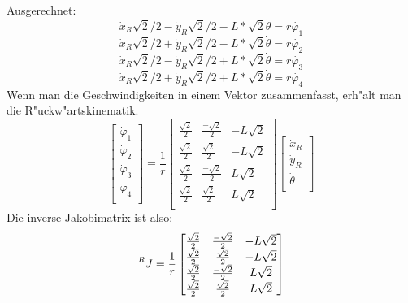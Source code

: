 \documentclass[11pt]{article}
\begin{document}
    Ausgerechnet:
    \begin{equation}
        \dot{x}_{R}\sqrt{2}/2 - \dot{y}_{R}\sqrt{2}/2 - L*\sqrt{2}\dot{\theta} = r\dot{\varphi_{1}}\label{eq:calc1}
    \end{equation}
    \begin{equation}
        \dot{x}_{R}\sqrt{2}/2 + \dot{y}_{R}\sqrt{2}/2 - L*\sqrt{2}\dot{\theta} = r\dot{\varphi_{2}}\label{eq:calc2}
    \end{equation}
    \begin{equation}
        \dot{x}_{R}\sqrt{2}/2 - \dot{y}_{R}\sqrt{2}/2 + L*\sqrt{2}\dot{\theta} = r\dot{\varphi_{3}}\label{eq:calc3}
    \end{equation}
    \begin{equation}
        \dot{x}_{R}\sqrt{2}/2 + \dot{y}_{R}\sqrt{2}/2 + L*\sqrt{2}\dot{\theta} = r\dot{\varphi_{4}}\label{eq:calc4}
    \end{equation}
    Wenn man die Geschwindigkeiten in einem Vektor zusammenfasst, erh"alt man die R"uckw"artskinematik.
    \begin{equation}
        \begin{bmatrix}
            \dot{\varphi}_{1} \\
            \dot{\varphi}_{2} \\
            \dot{\varphi}_{3} \\
            \dot{\varphi}_{4} \\
        \end{bmatrix}\label{eq:rueck} = \frac{1}{r}
        \begin{bmatrix}
            \frac{\sqrt{2}}{2} & \frac{-\sqrt{2}}{2} & -L\sqrt{2} \\
            \frac{\sqrt{2}}{2} & \frac{\sqrt{2}}{2} & -L\sqrt{2} \\
            \frac{\sqrt{2}}{2} & \frac{-\sqrt{2}}{2} & L\sqrt{2} \\
            \frac{\sqrt{2}}{2} & \frac{\sqrt{2}}{2} & L\sqrt{2} \\
        \end{bmatrix}
        \begin{bmatrix}
            \dot{x}_{R} \\
            \dot{y}_{R} \\
            \dot{\theta} \\
        \end{bmatrix}
    \end{equation}
    Die inverse Jakobimatrix ist also:
    \begin{equation}
        \prescript{R}{}{J} = \frac{1}{r}
        \begin{bmatrix}
            \frac{\sqrt{2}}{2} & \frac{-\sqrt{2}}{2} & -L\sqrt{2} \\
            \frac{\sqrt{2}}{2} & \frac{\sqrt{2}}{2} & -L\sqrt{2} \\
            \frac{\sqrt{2}}{2} & \frac{-\sqrt{2}}{2} & L\sqrt{2} \\
            \frac{\sqrt{2}}{2} & \frac{\sqrt{2}}{2} & L\sqrt{2} \\
        \end{bmatrix}\label{eq:jakobi}
    \end{equation}
\end{document}
